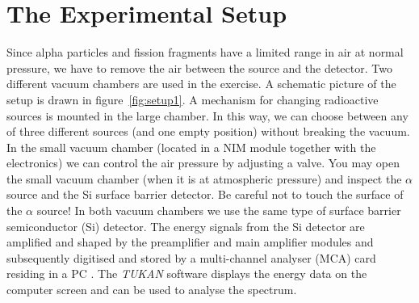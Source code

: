 \documentclass[12pt]{article}
\begin{document}
\section*{The Experimental Setup}
Since alpha particles and fission fragments have a limited range 
in air at normal pressure, we have to remove the air between 
the source and the detector. Two different vacuum
chambers are used in the exercise. A schematic picture of the setup
is drawn in figure~\ref{fig:setup1}.  A mechanism for changing
radioactive sources is mounted in the large chamber. In this way, we
can choose between any of three different sources (and one empty
position) without breaking the vacuum.  In the small vacuum chamber
(located in a NIM module together with the electronics) we can control
the air pressure by adjusting a valve. You may open the small vacuum
chamber (when it is at atmospheric pressure) and inspect the $\alpha$ source
and the Si surface barrier detector. Be careful not to touch the surface
of the $\alpha$ source! In both vacuum chambers we use the same
type of surface barrier semiconductor (Si) detector. The energy signals from the Si
detector are amplified and shaped by the preamplifier and main amplifier modules
and subsequently digitised and stored by a multi-channel analyser
(MCA) card residing in a PC .  The \emph{TUKAN} software displays the energy data on
the computer screen and can be used to analyse the spectrum.
\end{document}
